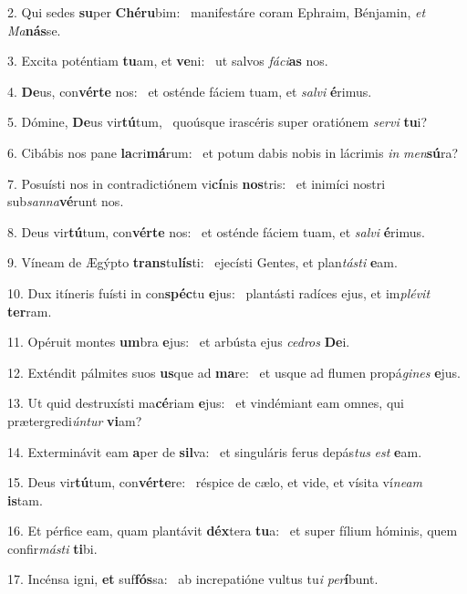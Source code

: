 2. Qui sedes \textbf{su}per \textbf{Ché}\textbf{ru}bim: \ast\  manifestáre coram Ephraim, Bénjamin, \textit{et} \textit{Ma}\textbf{nás}se.\

3. Excita poténtiam \textbf{tu}am, et \textbf{ve}ni: \ast\  ut salvos \textit{fá}\textit{ci}\textbf{as} nos.\

4. \textbf{De}us, con\textbf{vér}\textbf{te} nos: \ast\  et osténde fáciem tuam, et \textit{sal}\textit{vi} \textbf{é}rimus.\

5. Dómine, \textbf{De}us vir\textbf{tú}tum, \ast\  quoúsque irascéris super oratiónem \textit{ser}\textit{vi} \textbf{tu}i?\

6. Cibábis nos pane \textbf{la}cri\textbf{má}rum: \ast\  et potum dabis nobis in lácrimis \textit{in} \textit{men}\textbf{sú}ra?\

7. Posuísti nos in contradictiónem vi\textbf{cí}nis \textbf{nos}tris: \ast\  et inimíci nostri sub\textit{san}\textit{na}\textbf{vé}runt nos.\

8. Deus vir\textbf{tú}tum, con\textbf{vér}\textbf{te} nos: \ast\  et osténde fáciem tuam, et \textit{sal}\textit{vi} \textbf{é}rimus.\

9. Víneam de Ægýpto \textbf{trans}tu\textbf{lís}ti: \ast\  ejecísti Gentes, et plan\textit{tás}\textit{ti} \textbf{e}am.\

10. Dux itíneris fuísti in con\textbf{spéc}tu \textbf{e}jus: \ast\  plantásti radíces ejus, et im\textit{plé}\textit{vit} \textbf{ter}ram.\

11. Opéruit montes \textbf{um}bra \textbf{e}jus: \ast\  et arbústa ejus \textit{ce}\textit{dros} \textbf{De}i.\

12. Exténdit pálmites suos \textbf{us}que ad \textbf{ma}re: \ast\  et usque ad flumen propá\textit{gi}\textit{nes} \textbf{e}jus.\

13. Ut quid destruxísti ma\textbf{cé}riam \textbf{e}jus: \ast\  et vindémiant eam omnes, qui prætergredi\textit{ún}\textit{tur} \textbf{vi}am?\

14. Exterminávit eam \textbf{a}per de \textbf{sil}va: \ast\  et singuláris ferus depás\textit{tus} \textit{est} \textbf{e}am.\

15. Deus vir\textbf{tú}tum, con\textbf{vér}\textbf{te}re: \ast\  réspice de cælo, et vide, et vísita ví\textit{ne}\textit{am} \textbf{is}tam.\

16. Et pérfice eam, quam plantávit \textbf{déx}tera \textbf{tu}a: \ast\  et super fílium hóminis, quem confir\textit{más}\textit{ti} \textbf{ti}bi.\

17. Incénsa igni, \textbf{et} suf\textbf{fós}sa: \ast\  ab increpatióne vultus tu\textit{i} \textit{per}\textbf{í}bunt.\

